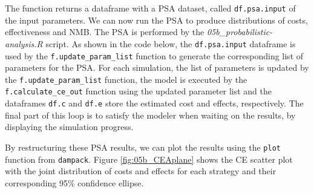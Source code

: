 \documentclass[]{article}
\newenvironment{Shaded}{\begin{snugshade}}{\end{snugshade}}
\newcommand{\KeywordTok}[1]{\textcolor[rgb]{0.13,0.29,0.53}{\textbf{#1}}}
\newcommand{\DataTypeTok}[1]{\textcolor[rgb]{0.13,0.29,0.53}{#1}}
\newcommand{\DecValTok}[1]{\textcolor[rgb]{0.00,0.00,0.81}{#1}}
\newcommand{\CharTok}[1]{\textcolor[rgb]{0.31,0.60,0.02}{#1}}
\newcommand{\StringTok}[1]{\textcolor[rgb]{0.31,0.60,0.02}{#1}}
\newcommand{\CommentTok}[1]{\textcolor[rgb]{0.56,0.35,0.01}{\textit{#1}}}
\newcommand{\ControlFlowTok}[1]{\textcolor[rgb]{0.13,0.29,0.53}{\textbf{#1}}}
\newcommand{\OperatorTok}[1]{\textcolor[rgb]{0.81,0.36,0.00}{\textbf{#1}}}
\newcommand{\NormalTok}[1]{#1}
\begin{document}
The function returns a dataframe with a PSA dataset, called
\texttt{df.psa.input} of the input parameters. We can now run the PSA to
produce distributions of costs, effectiveness and NMB. The PSA is
performed by the \emph{05b\_probabilistic-analysis.R} script. As shown
in the code below, the \texttt{df.psa.input} dataframe is used by the
\texttt{f.update\_param\_list} function to generate the corresponding
list of parameters for the PSA. For each simulation, the list of
parameters is updated by the \texttt{f.update\_param\_list} function,
the model is executed by the \texttt{f.calculate\_ce\_out} function
using the updated parameter list and the dataframes \texttt{df.c} and
\texttt{df.e} store the estimated cost and effects, respectively. The
final part of this loop is to satisfy the modeler when waiting on the
results, by displaying the simulation progress.

\begin{Shaded}
\end{Shaded}

By restructuring these PSA results, we can plot the results using the
\texttt{plot} function from \texttt{dampack}. Figure
\ref{fig:05b_CEAplane} shows the CE scatter plot with the joint
distribution of costs and effects for each strategy and their
corresponding 95\% confidence ellipse.
\end{document}

